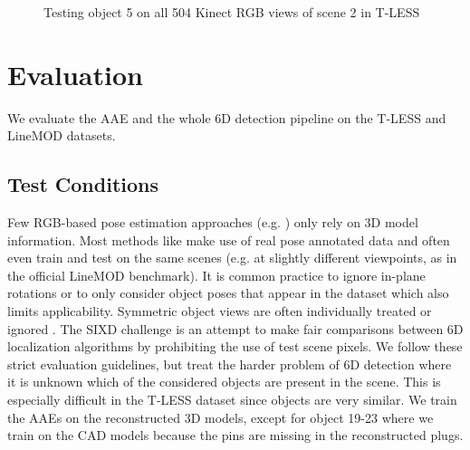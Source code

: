 \begin{figure}[t]%
	
	\centering
	
	 \qquad
	\captionsetup{}
	\caption{Testing object 5 on all 504 Kinect RGB views of scene 2 in T-LESS}
	
\end{figure}

\section{Evaluation}

We evaluate the \gls{AAE} and the whole 6D detection pipeline on the T-LESS \citep{hodan2017tless} and LineMOD \citep{hinterstoisser2011multimodal} datasets.
\subsection{Test Conditions}
\label{sec:cond}
Few RGB-based pose estimation approaches (e.g. \cite{kehl2017ssd,ulrich2009cad}) only rely on 3D model information. Most methods like \cite{wohlhart2015learning,balntas2017pose,brachmann2016uncertainty} make use of real pose annotated data and often even train and test on the same scenes (e.g. at slightly different viewpoints, as in the official LineMOD benchmark). It is common practice to ignore in-plane rotations or to only consider object poses that appear in the dataset \citep{rad2017bb8,wohlhart2015learning} which also limits applicability. Symmetric object views are often individually treated \citep{rad2017bb8,balntas2017pose} or ignored \citep{wohlhart2015learning}. 
The SIXD challenge \citep{sixd} is an attempt to make fair comparisons between 6D localization algorithms by prohibiting the use of test scene pixels. We follow these strict evaluation guidelines, but treat the harder problem of 6D detection where it is unknown which of the considered objects are present in the scene. This is especially difficult in the T-LESS dataset since objects are very similar. 
We train the AAEs on the reconstructed 3D models, except for object 19-23 where we train on the CAD models because the pins are missing in the reconstructed plugs. 

